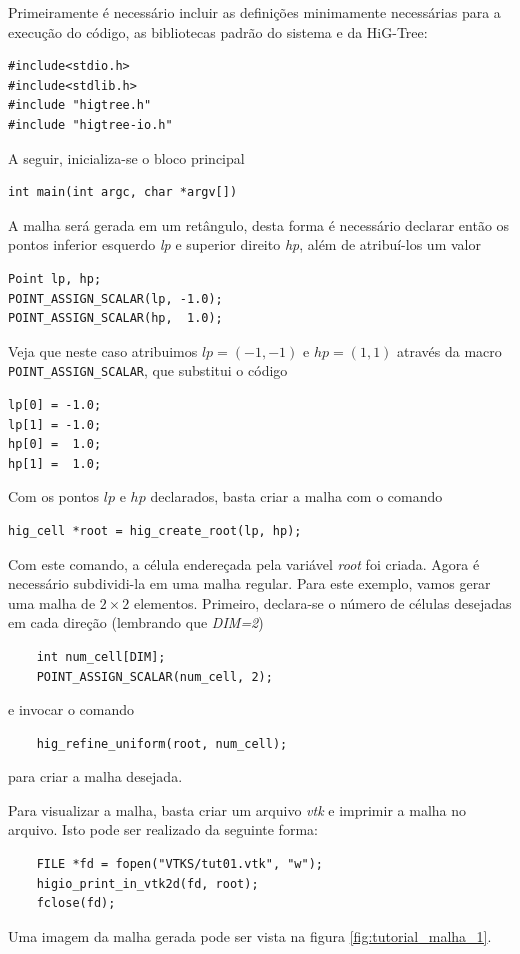 Primeiramente é necessário incluir as definições minimamente necessárias para a execução do código, as bibliotecas padrão do sistema e da HiG-Tree:
\begin{verbatim}
#include<stdio.h>
#include<stdlib.h>
#include "higtree.h"
#include "higtree-io.h"
\end{verbatim}
A seguir, inicializa-se o bloco principal
\begin{verbatim}
int main(int argc, char *argv[])
\end{verbatim}
A malha será gerada em um retângulo, desta forma é necessário declarar então os pontos inferior esquerdo {\it lp} e superior direito {\it hp}, além de atribuí-los um valor
\begin{verbatim}
Point lp, hp;
POINT_ASSIGN_SCALAR(lp, -1.0);
POINT_ASSIGN_SCALAR(hp,  1.0);
\end{verbatim}
Veja que neste caso atribuimos $ lp=(-1,-1)$ e $ hp=(1,1)$ através da macro \verb|POINT_ASSIGN_SCALAR|, que substitui o código
\begin{verbatim}
lp[0] = -1.0;
lp[1] = -1.0;
hp[0] =  1.0;
hp[1] =  1.0;
\end{verbatim}
Com os pontos $lp$ e $hp$ declarados, basta criar a malha com o comando
\begin{verbatim}
hig_cell *root = hig_create_root(lp, hp);
\end{verbatim}

Com este comando, a célula endereçada pela variável {\it root} foi criada. Agora é necessário subdividi-la em uma malha regular. Para este exemplo, vamos gerar uma malha de $2\times 2$ elementos. Primeiro, declara-se o número de células desejadas em cada direção (lembrando que {\it DIM=2})
\begin{verbatim}
	int num_cell[DIM];
	POINT_ASSIGN_SCALAR(num_cell, 2);
\end{verbatim}
e invocar o comando
\begin{verbatim}
	hig_refine_uniform(root, num_cell);
\end{verbatim}
para criar a malha desejada.

Para visualizar a malha, basta criar um arquivo {\it vtk} e imprimir a malha  no arquivo. Isto pode ser realizado da seguinte forma:
\begin{verbatim}
	FILE *fd = fopen("VTKS/tut01.vtk", "w");
	higio_print_in_vtk2d(fd, root);
	fclose(fd);
\end{verbatim}
Uma imagem da malha gerada pode ser vista na figura \ref{fig:tutorial_malha_1}.

